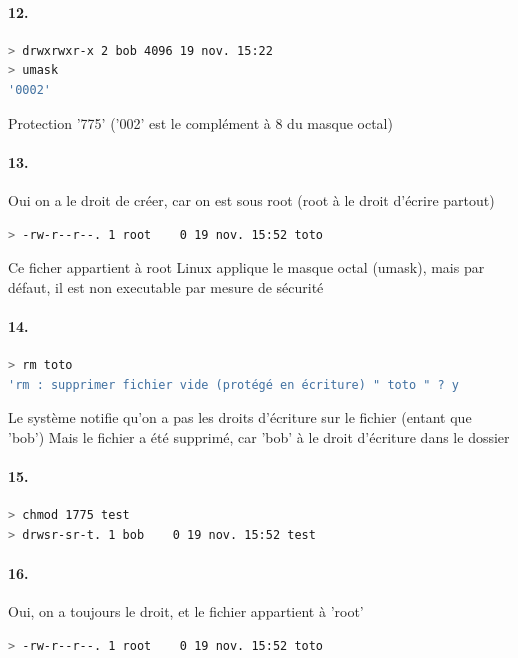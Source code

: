 \documentclass[10pt]{article}
\begin{document}
        \paragraph{12.}
\begin{lstlisting}[language=bash]
> drwxrwxr-x 2 bob 4096 19 nov. 15:22
> umask
'0002'
\end{lstlisting}
Protection '775' ('002' est le complément à 8 du masque octal)

        \paragraph{13.}
        
Oui on a le droit de créer, car on est sous root (root à le droit d'écrire partout)
\begin{lstlisting}[language=bash]
> -rw-r--r--. 1 root    0 19 nov. 15:52 toto
\end{lstlisting}

Ce ficher appartient à root
Linux applique le masque octal (umask), mais par défaut, il est non executable par mesure de sécurité

        
        \paragraph{14.}
\begin{lstlisting}[language=bash]
> rm toto
'rm : supprimer fichier vide (protégé en écriture) " toto " ? y
\end{lstlisting}
Le système notifie qu'on a pas les droits d'écriture sur le fichier (entant que 'bob')
Mais le fichier a été supprimé, car 'bob' à le droit d'écriture dans le dossier
        
        \paragraph{15.}
\begin{lstlisting}[language=bash]
> chmod 1775 test
> drwsr-sr-t. 1 bob    0 19 nov. 15:52 test
\end{lstlisting}

        \paragraph{16.}
Oui, on a toujours le droit, et le fichier appartient à 'root'
\begin{lstlisting}[language=bash]
> -rw-r--r--. 1 root    0 19 nov. 15:52 toto
\end{lstlisting}
 
\end{document}
